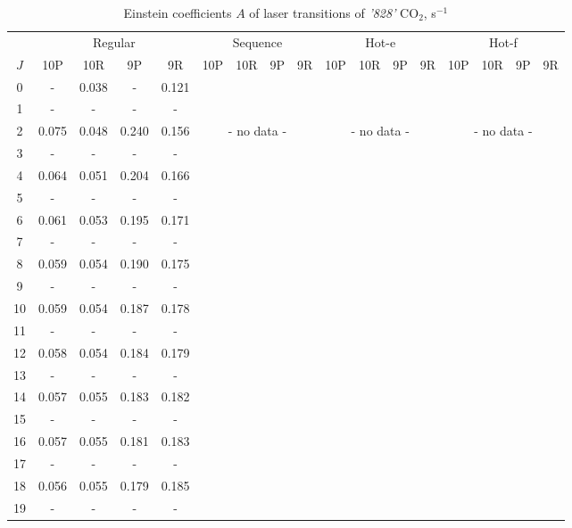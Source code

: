 \documentclass{report}
\begin{document}
\begin{table}
\centering
\caption{Einstein coefficients $A$ of laser transitions of \textit{'828'} CO$_2$, s$^{-1}$}
\scriptsize
\begin{tabular}{|c|cccc|cccc|cccc|cccc|}
\hline
& \multicolumn{4}{c|}{Regular}& \multicolumn{4}{c|}{Sequence}& \multicolumn{4}{c|}{Hot-e}& \multicolumn{4}{c|}{Hot-f}\\
$J$ & 10P & 10R & 9P & 9R & 10P & 10R & 9P & 9R & 10P & 10R & 9P & 9R & 10P & 10R & 9P & 9R\\ 
\hline
0  &   -   & 0.038 &   -   & 0.121 & & & & & & & & & & & &\\
1  &   -   &   -   &   -   &   -   & & & & & & & & & & & &\\
2  & 0.075 & 0.048 & 0.240 & 0.156 & \multicolumn{4}{c|}{- no data -}& \multicolumn{4}{c|}{- no data -}& \multicolumn{4}{c|}{- no data -}\\
3  &   -   &   -   &   -   &   -   & & & & & & & & & & & &\\
4  & 0.064 & 0.051 & 0.204 & 0.166 & & & & & & & & & & & &\\
5  &   -   &   -   &   -   &   -   & & & & & & & & & & & &\\
6  & 0.061 & 0.053 & 0.195 & 0.171 & & & & & & & & & & & &\\
7  &   -   &   -   &   -   &   -   & & & & & & & & & & & &\\
8  & 0.059 & 0.054 & 0.190 & 0.175 & & & & & & & & & & & &\\
9  &   -   &   -   &   -   &   -   & & & & & & & & & & & &\\
10 & 0.059 & 0.054 & 0.187 & 0.178 & & & & & & & & & & & &\\
11 &   -   &   -   &   -   &   -   & & & & & & & & & & & &\\
12 & 0.058 & 0.054 & 0.184 & 0.179 & & & & & & & & & & & &\\
13 &   -   &   -   &   -   &   -   & & & & & & & & & & & &\\
14 & 0.057 & 0.055 & 0.183 & 0.182 & & & & & & & & & & & &\\
15 &   -   &   -   &   -   &   -   & & & & & & & & & & & &\\
16 & 0.057 & 0.055 & 0.181 & 0.183 & & & & & & & & & & & &\\
17 &   -   &   -   &   -   &   -   & & & & & & & & & & & &\\
18 & 0.056 & 0.055 & 0.179 & 0.185 & & & & & & & & & & & &\\
19 &   -   &   -   &   -   &   -   & & & & & & & & & & & &\\

\end{tabular}
\end{table}
\end{document}
